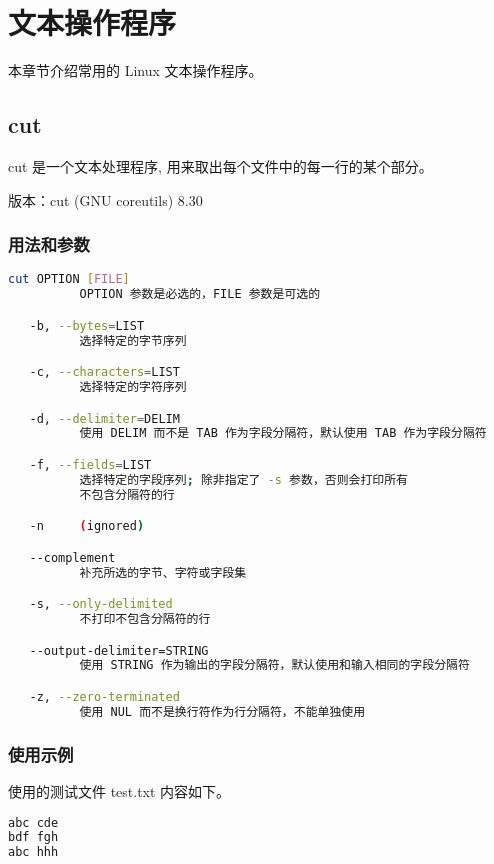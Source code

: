 \chapter{文本操作程序}

本章节介绍常用的 Linux 文本操作程序。

\section{cut}

cut 是一个文本处理程序, 用来取出每个文件中的每一行的某个部分。

版本：cut (GNU coreutils) 8.30

\subsection{用法和参数}

\begin{lstlisting}[language=bash, numbersep=1em, numberstyle=\footnotesize , breaklines=true]
cut OPTION [FILE]
          OPTION 参数是必选的，FILE 参数是可选的

   -b, --bytes=LIST
          选择特定的字节序列

   -c, --characters=LIST
          选择特定的字符序列

   -d, --delimiter=DELIM
          使用 DELIM 而不是 TAB 作为字段分隔符，默认使用 TAB 作为字段分隔符

   -f, --fields=LIST
          选择特定的字段序列; 除非指定了 -s 参数，否则会打印所有
          不包含分隔符的行

   -n     (ignored)

   --complement
          补充所选的字节、字符或字段集

   -s, --only-delimited
          不打印不包含分隔符的行

   --output-delimiter=STRING
          使用 STRING 作为输出的字段分隔符，默认使用和输入相同的字段分隔符

   -z, --zero-terminated
          使用 NUL 而不是换行符作为行分隔符，不能单独使用
\end{lstlisting}

\subsection{使用示例}

使用的测试文件 test.txt 内容如下。
\begin{lstlisting}[language=bash, numbersep=1em, numberstyle=\footnotesize , breaklines=true]
abc cde
bdf fgh
abc hhh
\end{lstlisting}


